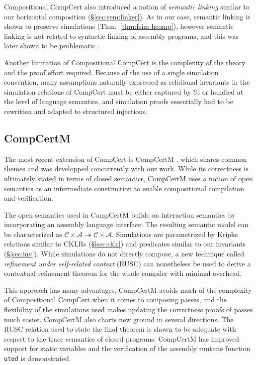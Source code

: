 \documentclass[11pt,oneside,draft]{book}
\theoremstyle{definition}
\begin{document}
Compositional CompCert also introduced a notion of \emph{semantic linking}
similar to our horizontal composition
(\S\ref{sec:sem:linker}).
As in our case,
semantic linking is shown to preserve simulations
(Thm.~\ref{thm:fsim-hcomp}),
however semantic linking is not related to
syntactic linking of assembly programs,
and this was later shown to be problematic \citep{compcertm}.

Another limitation of Compositional CompCert
is the complexity of the theory
and the proof effort required.
Because of the use of a single simulation convention,
many assumptions naturally expressed as
relational invariants in the simulation relations of CompCert
must be either captured by $\mathbb{SI}$
or handled at the level of language semantics,
and simulation proofs
essentially had to be rewritten and adapted to
structured injections.


\subsection{CompCertM} %

The most recent extension of CompCert is CompCertM \citep{compcertm},
which shares common themes and was developped concurrently
with our work.
While its correctness
is ultimately stated in terms of closed semantics,
CompCertM uses a notion of open semantics
as an intermediate construction
to enable compositional compilation and verification.

The open semantics used in CompCertM
builds on interaction semantics
by incorporating an assembly language interface.
The resulting semantic model can be characterized as
$\mathcal{C} \times \mathcal{A} \twoheadrightarrow
 \mathcal{C} \times \mathcal{A}$.
Simulations
are parametrized by Kripke relations similar to CKLRs (\S\ref{sec:cklr})
and predicates similar to our invariants (\S\ref{sec:inv}).
While simulations do not directly compose,
a new technique called \emph{refinement under self-related context}
(RUSC)
can nonetheless be used to derive a contextual refinement theorem
for the whole compiler with minimal overhead.

This approach has many advantages.
CompCertM avoids much of the complexity
of Compositional CompCert
when it comes to composing passes,
and the flexibility of the simulations used
makes updating the correctness proofs of passes much easier.
CompCertM also charts new ground in several directions.
The RUSC relation used to state the final theorem
is shown to be adequate with respect to the trace semantics
of closed programs.
CompCertM has improved support for static variables
and the verification of
the assembly runtime function \texttt{utod} is demonstrated.
\end{document}
